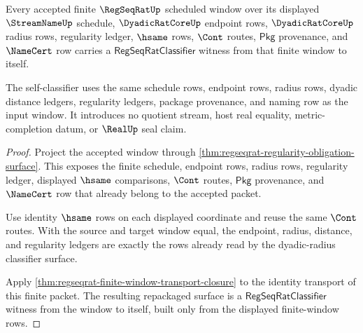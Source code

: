 \begin{theorem}
\label{thm:regseqrat-finite-window-classifier-reflexivity}
Every accepted finite $\RegSeqRatUp$ scheduled window over its displayed $\StreamNameUp$ schedule, $\DyadicRatCoreUp$ endpoint rows, $\DyadicRatCoreUp$ radius rows, regularity ledger, $\hsame$ rows, $\Cont$ routes, $\mathsf{Pkg}$ provenance, and $\NameCert$ row carries a $\mathsf{RegSeqRatClassifier}$ witness from that finite window to itself.

The self-classifier uses the same schedule rows, endpoint rows, radius rows, dyadic distance ledgers, regularity ledgers, package provenance, and naming row as the input window. It introduces no quotient stream, host real equality, metric-completion datum, or $\RealUp$ seal claim.
\end{theorem}
\begin{proof}
Project the accepted window through \autoref{thm:regseqrat-regularity-obligation-surface}. This exposes the finite schedule, endpoint rows, radius rows, regularity ledger, displayed $\hsame$ comparisons, $\Cont$ routes, $\mathsf{Pkg}$ provenance, and $\NameCert$ row that already belong to the accepted packet.

Use identity $\hsame$ rows on each displayed coordinate and reuse the same $\Cont$ routes. With the source and target window equal, the endpoint, radius, distance, and regularity ledgers are exactly the rows already read by the dyadic-radius classifier surface.

Apply \autoref{thm:regseqrat-finite-window-transport-closure} to the identity transport of this finite packet. The resulting repackaged surface is a $\mathsf{RegSeqRatClassifier}$ witness from the window to itself, built only from the displayed finite-window rows.
\end{proof}

